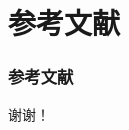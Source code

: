 \documentclass[AutoFakeBold,AutoFakeSlant]{beamer}
\begin{document}
\section{参考文献}
\begin{frame}
	\frametitle{参考文献}
	
\end{frame}



\begin{frame}[plain]
  
    \LARGE{
   谢谢！}
  
\end{frame}
\end{document}
